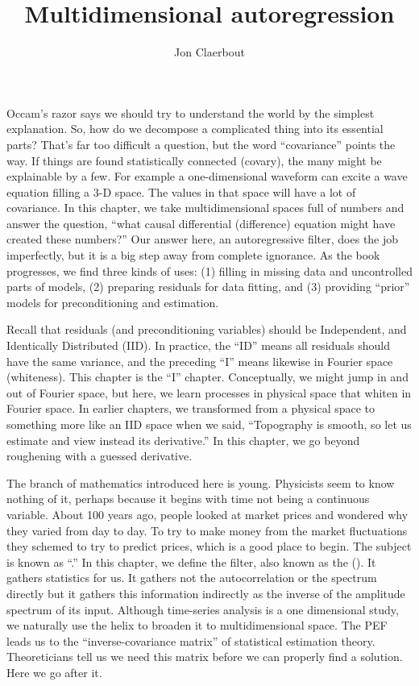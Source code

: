 \long{}

\title{Multidimensional autoregression}
\author{Jon Claerbout}
\maketitle
\label{paper:mda}


Occam's razor says we should try to understand the world by the simplest explanation.
So, how do we decompose a complicated thing into its essential parts?
That's far too difficult a question, but the word ``covariance'' points the way.
If things are found statistically connected (covary), the many might be explainable by a few.
For example a one-dimensional waveform can excite a wave equation filling a 3-D space.
The values in that space will have a lot of covariance.
In this chapter, we take multidimensional spaces full of numbers
and answer the question,
``what causal differential (difference) equation might have created these numbers?''
Our answer here, an autoregressive filter, does the job imperfectly,
but it is a big step away from complete ignorance.
As the book progresses, we find three kinds of uses:
(1) filling in missing data and uncontrolled parts of models,
(2) preparing residuals for data fitting,
and
(3) providing ``prior'' models for preconditioning and estimation.

\par
Recall that residuals (and preconditioning variables) should be
Independent, and Identically Distributed (IID).
In practice, the ``ID'' means all residuals should have the same variance,
and the preceding ``I'' means likewise in Fourier space (whiteness).
This chapter is the ``I'' chapter.
Conceptually, we might jump in and out of Fourier space,
but here, we learn processes in physical space
that whiten in Fourier space.
In earlier chapters, we transformed from a physical space
to something more like an IID space when we said,
``Topography is smooth, so let us estimate and view instead its derivative.''
In this chapter,
we go beyond roughening with a guessed derivative.
\par
The branch of mathematics introduced here is young.
Physicists seem to know nothing of it,
perhaps because it begins with time not being a continuous variable.
About 100 years ago, people looked at market prices
and wondered why they varied from day to day.
To try to make money from the market fluctuations
they schemed to try to predict prices, which
is a good place to begin.
The subject is known as ``.''
In this chapter, we define the {\it {}} filter,
also known as the  ().
It gathers statistics for us.
It gathers not the autocorrelation or the spectrum directly
but it gathers this information indirectly
as the inverse of the amplitude spectrum of its input.
Although time-series analysis is a one dimensional study,
we naturally use the helix to broaden it to multidimensional space.
The PEF leads us to the ``inverse-covariance matrix'' of statistical estimation theory.
Theoreticians tell us we need this matrix before we can properly find a solution.
Here we go after it.


